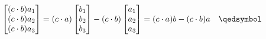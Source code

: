 \documentclass{article}
\begin{document}
\begin{enumerate}[(a)]
\begin{align*}
\begin{bmatrix}
                (c\cdot b)a_1\\
                (c\cdot b)a_2\\
                (c\cdot b)a_3
            \end{bmatrix} = (c\cdot a)\begin{bmatrix}
                b_1\\b_2\\b_3
            \end{bmatrix} - (c\cdot b)\begin{bmatrix}
                a_1\\a_2\\a_3
            \end{bmatrix} = (c\cdot a)b - (c\cdot b)a\quad\qedsymbol
        \end{align*}
    \end{enumerate}

    \newpage
\end{document}
